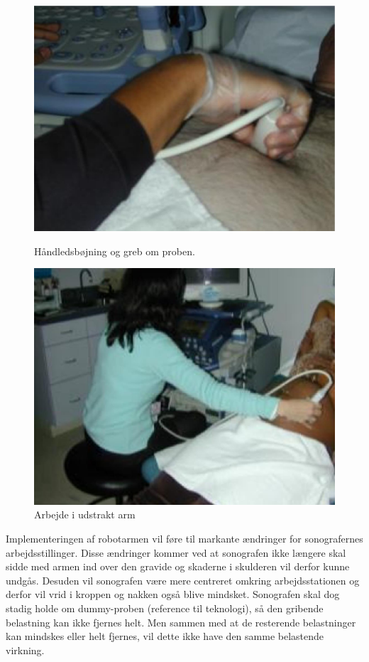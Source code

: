 \begin{figure}[H]
  \begin{minipage}{0.49\textwidth}
    \centering
      \includegraphics[width=\textwidth]{Figurer/wrist.jpg}
      \caption{Håndledsbøjning og greb om proben.}
    \label{wrist}
  \end{minipage}
  \hspace{0.02\textwidth}
  \begin{minipage}{0.47\textwidth}
    \centering
      \includegraphics[width=\textwidth]{Figurer/arm.jpg}
      \caption{Arbejde i udstrakt arm}
    \label{udstraktArm}
  \end{minipage}
\end{figure}
Implementeringen af robotarmen vil føre til markante ændringer for sonografernes arbejdsstillinger. Disse ændringer kommer ved at sonografen ikke længere skal sidde med armen ind over den gravide og skaderne i skulderen vil derfor kunne undgås. Desuden vil sonografen være mere centreret omkring arbejdsstationen og derfor vil vrid i kroppen og nakken også blive mindsket. Sonografen skal dog stadig holde om dummy-proben (reference til teknologi), så den gribende belastning kan ikke fjernes helt. Men sammen med at de resterende belastninger kan mindskes eller helt fjernes, vil dette ikke have den samme belastende virkning. 


